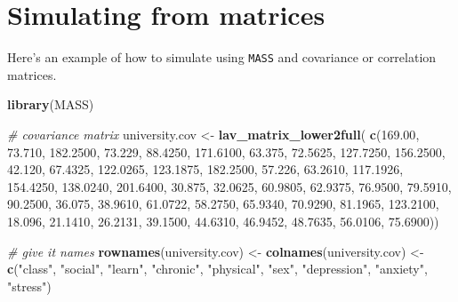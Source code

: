 \documentclass[
  man]{apa7}
\newenvironment{Shaded}{\begin{snugshade}}{\end{snugshade}}
\newcommand{\CommentTok}[1]{\textcolor[rgb]{0.56,0.35,0.01}{\textit{#1}}}
\newcommand{\FloatTok}[1]{\textcolor[rgb]{0.00,0.00,0.81}{#1}}
\newcommand{\FunctionTok}[1]{\textcolor[rgb]{0.13,0.29,0.53}{\textbf{#1}}}
\newcommand{\NormalTok}[1]{#1}
\newcommand{\OtherTok}[1]{\textcolor[rgb]{0.56,0.35,0.01}{#1}}
\newcommand{\StringTok}[1]{\textcolor[rgb]{0.31,0.60,0.02}{#1}}
\begin{document}
\normalsize

\newpage

\hypertarget{simulating-from-matrices}{%
\section{Simulating from matrices}\label{simulating-from-matrices}}

Here's an example of how to simulate using \texttt{MASS} and covariance or correlation matrices.

\small

\begin{Shaded}
\begin{Highlighting}[]
\FunctionTok{library}\NormalTok{(MASS)}

\CommentTok{\# covariance matrix}
\NormalTok{university.cov }\OtherTok{\textless{}{-}} \FunctionTok{lav\_matrix\_lower2full}\NormalTok{(}
    \FunctionTok{c}\NormalTok{(}\FloatTok{169.00}\NormalTok{, }
      \FloatTok{73.710}\NormalTok{, }\FloatTok{182.2500}\NormalTok{,}
      \FloatTok{73.229}\NormalTok{, }\FloatTok{88.4250}\NormalTok{, }\FloatTok{171.6100}\NormalTok{,}
      \FloatTok{63.375}\NormalTok{, }\FloatTok{72.5625}\NormalTok{, }\FloatTok{127.7250}\NormalTok{, }\FloatTok{156.2500}\NormalTok{,}
      \FloatTok{42.120}\NormalTok{, }\FloatTok{67.4325}\NormalTok{, }\FloatTok{122.0265}\NormalTok{, }\FloatTok{123.1875}\NormalTok{, }\FloatTok{182.2500}\NormalTok{,}
      \FloatTok{57.226}\NormalTok{, }\FloatTok{63.2610}\NormalTok{, }\FloatTok{117.1926}\NormalTok{, }\FloatTok{154.4250}\NormalTok{, }\FloatTok{138.0240}\NormalTok{, }\FloatTok{201.6400}\NormalTok{,}
      \FloatTok{30.875}\NormalTok{, }\FloatTok{32.0625}\NormalTok{, }\FloatTok{60.9805}\NormalTok{, }\FloatTok{62.9375}\NormalTok{, }\FloatTok{76.9500}\NormalTok{, }\FloatTok{79.5910}\NormalTok{, }\FloatTok{90.2500}\NormalTok{,}
      \FloatTok{36.075}\NormalTok{, }\FloatTok{38.9610}\NormalTok{, }\FloatTok{61.0722}\NormalTok{, }\FloatTok{58.2750}\NormalTok{, }\FloatTok{65.9340}\NormalTok{, }\FloatTok{70.9290}\NormalTok{, }\FloatTok{81.1965}\NormalTok{, }\FloatTok{123.2100}\NormalTok{,}
      \FloatTok{18.096}\NormalTok{, }\FloatTok{21.1410}\NormalTok{, }\FloatTok{26.2131}\NormalTok{, }\FloatTok{39.1500}\NormalTok{, }\FloatTok{44.6310}\NormalTok{, }\FloatTok{46.9452}\NormalTok{, }\FloatTok{48.7635}\NormalTok{, }\FloatTok{56.0106}\NormalTok{, }\FloatTok{75.6900}\NormalTok{))}

\CommentTok{\# give it names}
\FunctionTok{rownames}\NormalTok{(university.cov) }\OtherTok{\textless{}{-}}
    \FunctionTok{colnames}\NormalTok{(university.cov) }\OtherTok{\textless{}{-}}
    \FunctionTok{c}\NormalTok{(}\StringTok{"class"}\NormalTok{, }\StringTok{"social"}\NormalTok{, }\StringTok{"learn"}\NormalTok{, }\StringTok{"chronic"}\NormalTok{, }\StringTok{"physical"}\NormalTok{, }\StringTok{"sex"}\NormalTok{, }
      \StringTok{"depression"}\NormalTok{, }\StringTok{"anxiety"}\NormalTok{, }\StringTok{"stress"}\NormalTok{)}


\end{Highlighting}
\end{Shaded}
\end{document}
